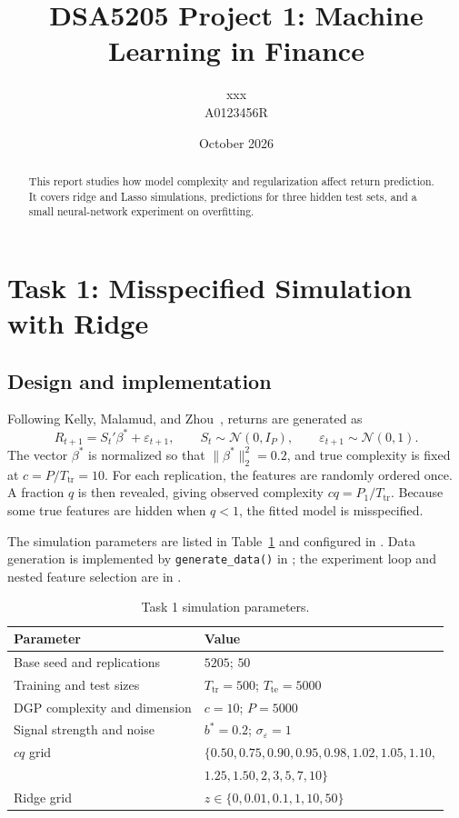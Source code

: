 \documentclass[11pt]{article}
\title{DSA5205 Project 1: Machine Learning in Finance}
\author{xxx  \\ A0123456R}
\date{October 2026}
\begin{document}
\maketitle

\begin{abstract}
This report studies how model complexity and regularization affect return
prediction. It covers ridge and Lasso simulations, predictions for three
hidden test sets, and a small neural-network experiment on overfitting.
\end{abstract}

\section{Task 1: Misspecified Simulation with Ridge}

\subsection{Design and implementation}

Following Kelly, Malamud, and Zhou~\cite{kelly2024}, returns are generated as
\begin{equation}
    R_{t+1}=S_t'\beta^*+\varepsilon_{t+1},
    \qquad S_t\sim\mathcal N(0,I_P),
    \qquad \varepsilon_{t+1}\sim\mathcal N(0,1).
\end{equation}
The vector $\beta^*$ is normalized so that $\|\beta^*\|_2^2=0.2$, and true
complexity is fixed at $c=P/T_{\mathrm{tr}}=10$. For each replication, the
features are randomly ordered once. A fraction $q$ is then revealed, giving
observed complexity $cq=P_1/T_{\mathrm{tr}}$. Because some true features are
hidden when $q<1$, the fitted model is misspecified.

The simulation parameters are listed in Table~\ref{tab:task1-parameters} and configured in . Data generation is implemented by \texttt{generate\_data()} in ; the experiment loop and nested feature selection are in .

\begin{table}[htbp]
    \centering
    \caption{Task 1 simulation parameters.}
    \label{tab:task1-parameters}
    \begin{tabular}{ll}
        \toprule
        Parameter & Value \\
        \midrule
        Base seed and replications & $5205$; $50$ \\
        Training and test sizes & $T_{\mathrm{tr}}=500$; $T_{\mathrm{te}}=5000$ \\
        DGP complexity and dimension & $c=10$; $P=5000$ \\
        Signal strength and noise & $b^*=0.2$; $\sigma_\varepsilon=1$ \\
        $cq$ grid & $\{0.50,0.75,0.90,0.95,0.98,1.02,1.05,1.10,$ \\
        & $1.25,1.50,2,3,5,7,10\}$ \\
        Ridge grid & $z\in\{0,0.01,0.1,1,10,50\}$ \\
        \bottomrule
    \end{tabular}
\end{table}
\end{document}
